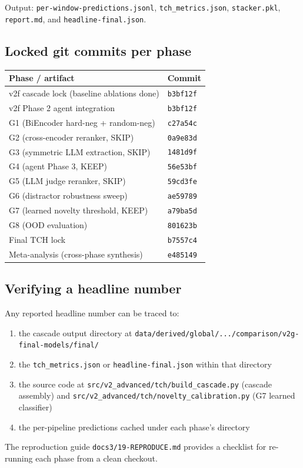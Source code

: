 Output: \texttt{per-window-predictions.jsonl}, \texttt{tch\_metrics.json}, \texttt{stacker.pkl}, \texttt{report.md}, and \texttt{headline-final.json}.

\subsection{Locked git commits per phase}

\begin{table}[h]
\centering
\small
\begin{tabular}{ll}
\toprule
Phase / artifact & Commit \\
\midrule
v2f cascade lock (baseline ablations done) & \texttt{b3bf12f} \\
v2f Phase 2 agent integration              & \texttt{b3bf12f} \\
G1 (BiEncoder hard-neg + random-neg)        & \texttt{c27a54c} \\
G2 (cross-encoder reranker, SKIP)           & \texttt{0a9e83d} \\
G3 (symmetric LLM extraction, SKIP)         & \texttt{1481d9f} \\
G4 (agent Phase 3, KEEP)                    & \texttt{56e53bf} \\
G5 (LLM judge reranker, SKIP)               & \texttt{59cd3fe} \\
G6 (distractor robustness sweep)            & \texttt{ae59789} \\
G7 (learned novelty threshold, KEEP)        & \texttt{a79ba5d} \\
G8 (OOD evaluation)                         & \texttt{801623b} \\
Final TCH lock                              & \texttt{b7557c4} \\
Meta-analysis (cross-phase synthesis)       & \texttt{e485149} \\
\bottomrule
\end{tabular}
\end{table}

\subsection{Verifying a headline number}

Any reported headline number can be traced to:

\begin{enumerate}
\item the cascade output directory at \texttt{data/derived/global/.../comparison/v2g-final-models/final/}
\item the \texttt{tch\_metrics.json} or \texttt{headline-final.json} within that directory
\item the source code at \texttt{src/v2\_advanced/tch/build\_cascade.py} (cascade assembly) and \texttt{src/v2\_advanced/tch/novelty\_calibration.py} (G7 learned classifier)
\item the per-pipeline predictions cached under each phase's directory
\end{enumerate}

The reproduction guide \texttt{docs3/19-REPRODUCE.md} provides a checklist for re-running each phase from a clean checkout.
